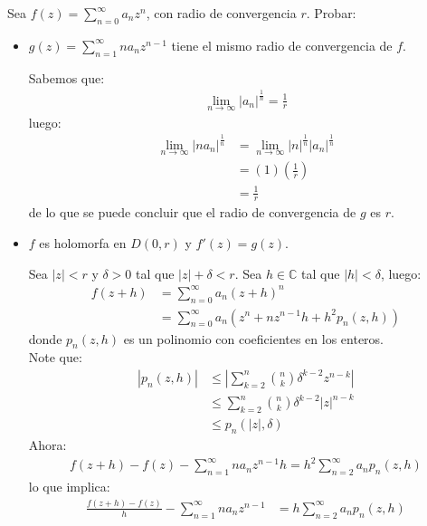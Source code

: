 \begin{homeworkProblem}
  Sea $f(z)=\sum_{n=0}^{\infty}a_nz^n$, con radio de convergencia $r$. Probar:
  \begin{itemize}
    \item $g(z)=\sum_{n=1}^{\infty}na_nz^{n-1}$ tiene el mismo radio de convergencia de $f$.
      \begin{solution}
        Sabemos que:
        \begin{align*}
          \lim_{n \to \infty}|a_n|^{\frac{1}{n}}=\frac{1}{r}
        \end{align*}
        luego:
        \begin{align*}
          \lim_{n \to \infty}|na_n|^{\frac{1}{n}}&=\lim_{n \to \infty}|n|^{\frac{1}{n}}|a_n|^{\frac{1}{n}}\\
          &=(1)\left( \frac{1}{r} \right)\\
          &=\frac{1}{r}
        \end{align*}
        de lo que se puede concluir que el radio de convergencia de $g$ es $r$.
        \demostrado
      \end{solution}
    \item $f$ es holomorfa en $D(0,r)$ y $f'(z)=g(z)$.
      \begin{solution}
        Sea $|z|<r$ y $\delta>0$ tal que $|z|+\delta < r$. Sea $h\in\mathbb{C}$ tal que $|h|<\delta$, luego:
        \begin{align*}
          f(z+h)&=\sum_{n=0}^{\infty}a_n(z+h)^{n}\\
          &=\sum_{n=0}^{\infty}a_n(z^n+nz^{n-1}h+h^2p_n(z,h))
        \end{align*}
        donde $p_n(z,h)$ es un polinomio con coeficientes en los enteros.\\
        Note que:
        \begin{align*}
          \left| p_n(z,h) \right|&\leq\left| \sum_{k=2}^{n} \binom{n}{k}\delta^{k-2}z^{n-k}\right|\\
          &\leq \sum_{k=2}^{n}\binom{n}{k}\delta^{k-2}|z|^{n-k}\\
          &\leq p_n(|z|,\delta)
        \end{align*}
        Ahora:
        \begin{align*}
          f(z+h)-f(z)-\sum_{n=1}^{\infty}na_nz^{n-1}h=h^2\sum_{n=2}^{\infty}a_np_n(z,h)
        \end{align*}
        lo que implica:
        \begin{align*}
          \frac{f(z+h)-f(z)}{h}-\sum_{n=1}^{\infty}na_nz^{n-1}&=h\sum_{n=2}^{\infty}a_np_n(z,h)

\end{align*}
\end{solution}
\end{itemize}
\end{homeworkProblem}
